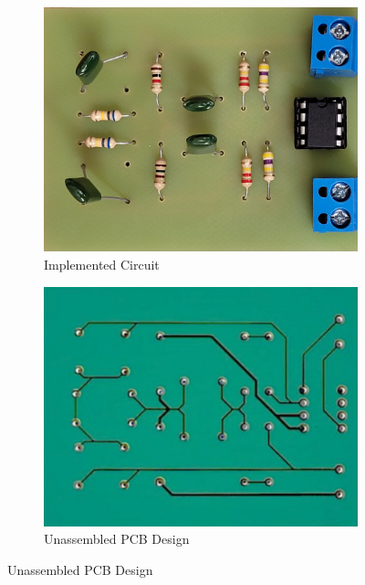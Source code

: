 \documentclass[hidelinks,12pt]{article}
\begin{document}
	
	\begin{figure}[!ht]
		\centering
		\begin{subfigure}{0.45\textwidth}
			\centering
			\includegraphics[height=0.8\linewidth]{figures/results/implemented_circuit_image}
			\caption{Implemented Circuit}
		\end{subfigure}
		\hfill
		\begin{subfigure}{0.45\textwidth}
			\centering
			\includegraphics[height=0.8\linewidth]{figures/results/unassembled}
			\caption{Unassembled PCB Design}
		\end{subfigure}
	\end{figure}
	
\end{document}
